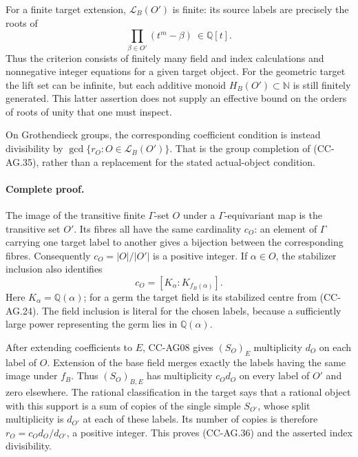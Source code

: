 For a finite target extension, \(\mathscr L_B(O')\) is finite:
its source labels are precisely the roots of
\[
                      \prod_{\beta\in O'}(t^m-\beta)
                               \ \in\mathbb Q[t].             \tag{CC-AG.40}
\]
Thus the criterion consists of finitely many field and index
calculations and nonnegative integer equations for a given
target object.  For the geometric target the lift set can be
infinite, but each additive monoid \(H_B(O')\subset\mathbb N\)
is still finitely generated.  This latter assertion does
not supply an effective bound on the orders of roots of
unity that one must inspect.

On Grothendieck groups, the corresponding coefficient condition
is instead divisibility by
\(\gcd\{r_O:O\in\mathscr L_B(O')\}\).  That is the group
completion of (CC-AG.35), rather than a replacement for
the stated actual-object condition.

\paragraph{Complete proof.}
The image of the transitive finite \(\Gamma\)-set \(O\)
under a \(\Gamma\)-equivariant map is the transitive set
\(O'\).  Its fibres all have the same cardinality \(c_O\):
an element of \(\Gamma\) carrying one target label to another
gives a bijection between the corresponding fibres.
Consequently \(c_O=|O|/|O'|\) is a positive integer.
If \(\alpha\in O\), the stabilizer inclusion also identifies
\[
       c_O=[K_\alpha:K_{f_B(\alpha)}].
                                                               \tag{CC-AG.41}
\]
Here \(K_\alpha=\mathbb Q(\alpha)\); for a germ the target
field is its stabilized centre from (CC-AG.24).
The field inclusion is literal for the chosen labels,
because a sufficiently large power representing the germ
lies in \(\mathbb Q(\alpha)\).

After extending coefficients to \(E\), CC-AG08 gives
\((S_O)_E\) multiplicity \(d_O\) on each label of \(O\).
Extension of the base field merges exactly the labels
having the same image under \(f_B\).  Thus \((S_O)_{B,E}\)
has multiplicity \(c_Od_O\) on every label of \(O'\) and
zero elsewhere.
The rational classification in the target says that a
rational object with this support is a sum of copies of
the single simple \(S_{O'}\), whose split multiplicity is
\(d_{O'}\) at each of these labels.  Its number of copies is
therefore \(r_O=c_Od_O/d_{O'}\), a positive integer.
This proves (CC-AG.36) and the asserted index divisibility.

